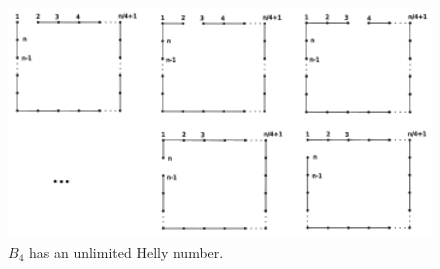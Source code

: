 \begin{figure}[!h]
\begin{center}












\includegraphics[width=12.5cm]{./img/b4epg.pdf}
\end{center}
\caption{$B_4$ has an unlimited Helly number.}
\end{figure}

